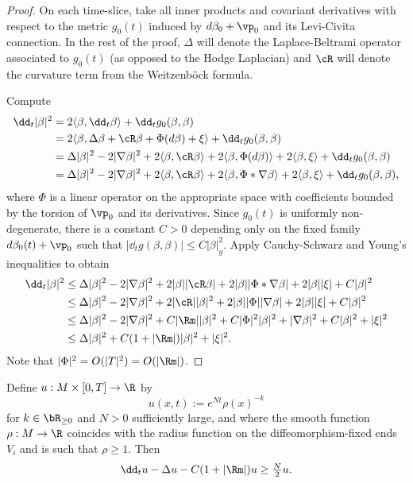 \documentclass[hidelinks, 12pt, oneside, reqno]{amsart}
\begin{document}
\begin{proof} On each time-slice, take all inner products and covariant derivatives with respect to the metric $g_0(t)$ induced by $d\beta_0 + \vp_0$ and its Levi-Civita connection. In the rest of the proof, $\Delta$ will denote the Laplace-Beltrami operator associated to $g_0(t)$ (as opposed to the Hodge Laplacian) and $\cR$ will denote the curvature term from the Weitzenb\"ock formula.

Compute
    \begin{align*}
        \dd_t |\beta|^2 &= 2\langle \beta, \dd_t \beta \rangle + \dd_t g_0 (\beta, \beta)\\
        &= 2\langle \beta, \Delta \beta + \cR \beta + \Phi (d\beta) + \xi \rangle +  \dd_t g_0 (\beta, \beta)\\
        &= \Delta |\beta|^2 - 2|\nabla \beta|^2 + 2 \langle \beta, \cR \beta \rangle + 2\langle \beta, \Phi (d \beta)\rangle  + 2 \langle \beta, \xi \rangle + \dd_t g_0 (\beta, \beta)\\
        &= \Delta |\beta|^2 - 2|\nabla \beta|^2 + 2 \langle \beta, \cR \beta \rangle  + 2\langle \beta, \Phi * \nabla \beta \rangle + 2 \langle \beta, \xi \rangle+ \dd_t g_0 (\beta, \beta),
    \end{align*}
    where $\Phi$ is a linear operator on the appropriate space with coefficients bounded by the torsion of $\vp_0$ and its derivatives. Since $g_0(t)$ is uniformly non-degenerate, there is a constant $C>0$ depending only on the fixed family $d\beta_0(t) + \vp_0$ such that $|\dd_t g (\beta, \beta)| \le C|\beta|_g^2$.
    Apply Cauchy-Schwarz and Young's inequalities to obtain
    \begin{align*}
        \dd_t |\beta|^2  &\le \Delta |\beta|^2 - 2|\nabla \beta|^2 + 2 |\beta| |\cR \beta| + 2|\beta| |\Phi * \nabla \beta| + 2|\beta| |\xi| + C|\beta|^2 \\
        &\le \Delta |\beta|^2 - 2|\nabla \beta|^2 + 2 |\cR| |\beta|^2 + 2|\beta| |\Phi| |\nabla \beta| + 2|\beta| |\xi| + C|\beta|^2 \\
        &\le \Delta |\beta|^2 - 2|\nabla \beta|^2 +  C|\Rm||\beta|^2 + C|\Phi|^2|\beta|^2 + |\nabla \beta|^2 + C|\beta|^2 + |\xi|^2\\
        &\le \Delta |\beta|^2 + C(1 +|\Rm|)|\beta|^2 +|\xi|^2.
    \end{align*}
    Note that $|\Phi|^2 = O(|T|^2) = O(|\Rm|)$.
\end{proof}

\begin{lem}\label{lemma barrier for norm}
    Define $u: M \times [0,T] \rightarrow \R$ by
    \[
    u(x,t) := e^{Nt}\rho(x)^{-k}
    \]
    for $k \in \bR_{\ge 0}$ and $N>0$ sufficiently large, and where the smooth function $\rho: M \rightarrow \R$ coincides with the radius function on the diffeomorphism-fixed ends $V_i$ and is such that $\rho \ge 1$. Then
    \begin{equation}\label{equation barrier inequality}
    \dd_t u - \Delta u - C(1 + |\Rm|)u \ge \tfrac{N}{2}u.
    \end{equation}
\end{lem}
\end{document}
